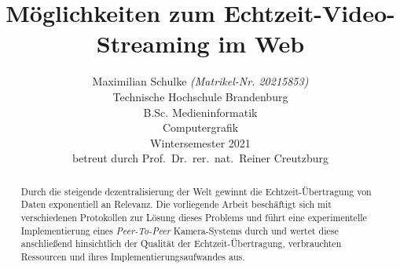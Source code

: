 \documentclass{article}
\title{Möglichkeiten zum Echtzeit-Video-Streaming im Web}
\author{
	\vspace{0.5em}
	Maximilian Schulke \textit{(Matrikel-Nr. 20215853)}\\
	\small{Technische Hochschule Brandenburg}\\
	\small{B.Sc. Medieninformatik}\\
	\small{Computergrafik}\\
	\small{Wintersemester 2021}\\
	\small{betreut durch Prof.\ Dr.\ rer.\ nat.\ Reiner Creutzburg}\\
}
\begin{document}
\begin{onecolumn}
	\begin{titlepage}


		\maketitle

		\begin{abstract}
			Durch die steigende dezentralisierung der Welt gewinnt die
			Echtzeit-Übertragung von Daten exponentiell an Relevanz. Die
			vorliegende Arbeit beschäftigt sich mit verschiedenen Protokollen
			zur Lösung dieses Problems und führt eine experimentelle
			Implementierung eines \textit{Peer-To-Peer} Kamera-Systems durch
			und wertet diese anschließend hinsichtlich der Qualität der
			Echtzeit-Übertragung, verbrauchten Ressourcen und ihres
			Implementierungsaufwandes aus.
		\end{abstract}

		\tableofcontents

		\listoffigures
	\end{titlepage}
\end{onecolumn}

\end{document}
